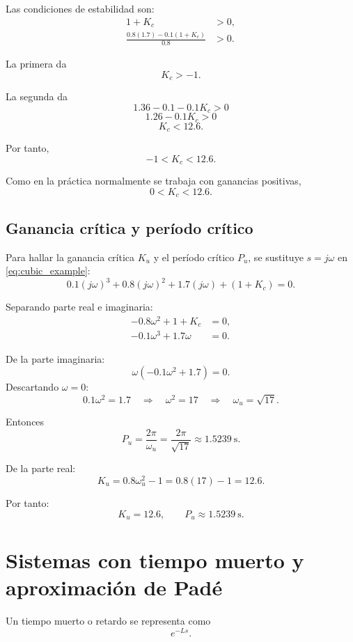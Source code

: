 \documentclass[11pt]{article}
\begin{document}
Las condiciones de estabilidad son:
\begin{align}
1+K_c &>0,\\
\frac{0.8(1.7)-0.1(1+K_c)}{0.8} &>0.
\end{align}

La primera da
\[
K_c>-1.
\]

La segunda da
\[
1.36-0.1-0.1K_c>0
\]
\[
1.26-0.1K_c>0
\]
\[
K_c<12.6.
\]

Por tanto,
\begin{equation}
-1<K_c<12.6.
\end{equation}

Como en la pr\'actica normalmente se trabaja con ganancias positivas,
\begin{equation}
0<K_c<12.6.
\end{equation}

\subsection{Ganancia cr\'itica y per\'iodo cr\'itico}
Para hallar la ganancia cr\'itica $K_u$ y el per\'iodo cr\'itico $P_u$, se sustituye $s=j\omega$ en \eqref{eq:cubic_example}:
\[
0.1(j\omega)^3+0.8(j\omega)^2+1.7(j\omega)+(1+K_c)=0.
\]

Separando parte real e imaginaria:
\begin{align}
-0.8\omega^2+1+K_c &= 0,\\
-0.1\omega^3+1.7\omega &= 0.
\end{align}

De la parte imaginaria:
\[
\omega(-0.1\omega^2+1.7)=0.
\]
Descartando $\omega=0$:
\[
0.1\omega^2=1.7
\quad\Rightarrow\quad
\omega^2=17
\quad\Rightarrow\quad
\omega_u=\sqrt{17}.
\]

Entonces
\begin{equation}
P_u=\frac{2\pi}{\omega_u}=\frac{2\pi}{\sqrt{17}}\approx 1.5239~\text{s}.
\end{equation}

De la parte real:
\[
K_u=0.8\omega_u^2-1=0.8(17)-1=12.6.
\]

Por tanto:
\begin{equation}
K_u=12.6,\qquad P_u\approx 1.5239~\text{s}.
\end{equation}

\section{Sistemas con tiempo muerto y aproximaci\'on de Pad\'e}
Un tiempo muerto o retardo se representa como
\[
e^{-Ls}.
\]
\end{document}
